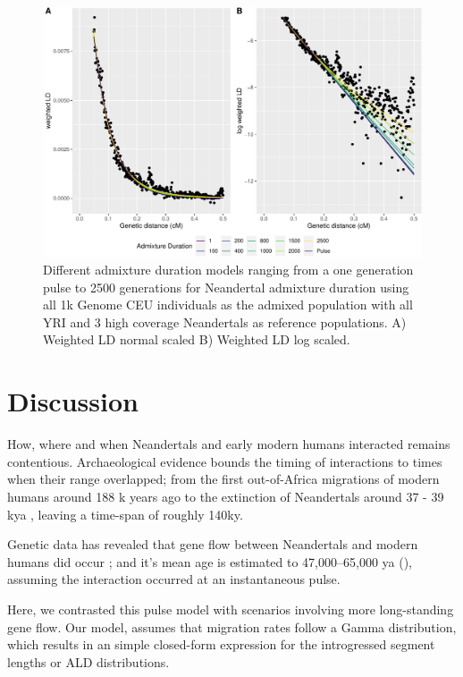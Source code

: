\documentclass[]{article}
\begin{document}
\begin{figure}
\centering
\includegraphics{Admixture_Time_Inference_Paper_Draft_files/figure-latex/fig5-1.pdf}
\caption{\label{fig:fig5} Different admixture duration models ranging
from a one generation pulse to 2500 generations for Neandertal admixture
duration using all 1k Genome CEU individuals as the admixed population
with all YRI and 3 high coverage Neandertals as reference populations. A) Weighted LD normal scaled B) Weighted LD log scaled.}
\end{figure}

\section{Discussion}\label{discussion}

How, where and when Neandertals and early modern humans interacted remains contentious.  
Archaeological evidence bounds the timing of interactions to times when their range overlapped; from the first out-of-Africa migrations of modern humans around 188 k years ago \citep{stringer_when_2018,hershkovitz_earliest_2018} to the extinction of Neandertals around 37 - 39 kya \citep{higham_timing_2014,zilhao_precise_2017}, leaving a time-span of roughly 140ky.

Genetic data has revealed that gene flow between Neandertals and modern humans did occur \citep{green_draft_2010}; and it's mean age is estimated to 47,000–65,000 ya (\citep{sankararaman_date_2012}), assuming the interaction occurred at an instantaneous pulse.

Here, we contrasted this pulse model with scenarios involving more long-standing gene flow.  Our model, assumes that migration rates  follow a Gamma distribution, which results in an simple closed-form expression for the introgressed segment lengths or ALD  distributions. 
\end{document}
